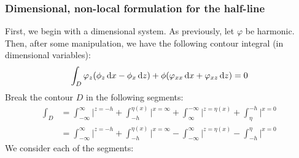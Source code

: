 \documentclass[10pt,reqno,oneside,a4paper]{article}
\begin{document}
\subsubsection{Dimensional, non-local formulation for the half-line}
First, we begin with a dimensional system. As previously, let $\varphi$ be harmonic. Then, after some manipulation, we have the following contour integral (in dimensional variables):
\begin{equation}
\int_D \varphi_z(\phi_z \,\mathrm{d} x - \phi_x \,\mathrm{d} z) + \phi(\varphi_{xx} \,\mathrm{d} x + \varphi_{xz} \,\mathrm{d} z) = 0
\end{equation}
Break the contour $D$ in the following segments:
\begin{align*}
\int_D &= \int_{-\infty}^{\infty} \bigg|^{z=-h} + \int^{\eta(x)}_{-h} \bigg|^{x = \infty} + \int^{-\infty}_{\infty} \bigg|^{z= \eta(x)} + \int_{\eta}^{-h} \bigg|^{x=0} \\
&= \int_{-\infty}^{\infty} \bigg|^{z=-h} + \int^{\eta(x)}_{-h} \bigg|^{x = \infty} - \int^{\infty}_{-\infty} \bigg|^{z= \eta(x)} - \int^{\eta}_{-h} \bigg|^{x=0}
\end{align*}
We consider each of the segments:
\end{document}
